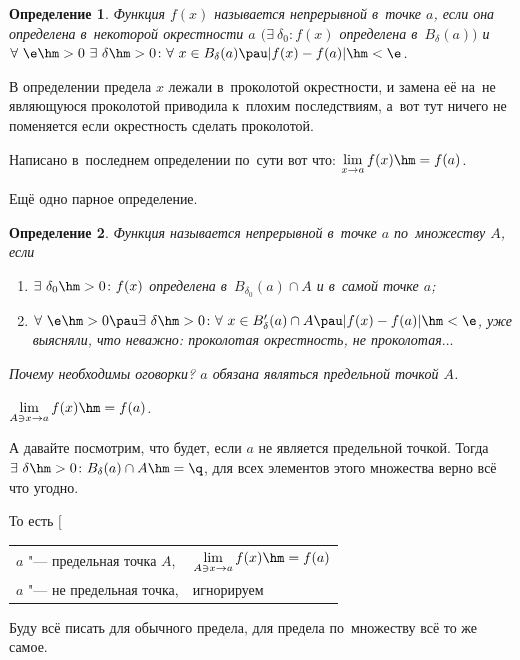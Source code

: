 \documentclass[a4paper,10pt,twoside]{article}
\newtheorem{Def}{Определение}[section]
\begin{document}
\begin{Def}
Функция $f(x)$ называется непрерывной в~точке $a$, если она определена в~некоторой окрестности 
$a$ $\big(\exists\ \delta_0\colon f(x)$ определена в~$B_\delta(a)\big)$ и 
$\forall\ \e\hm>0\ \exists\ \delta\hm>0\colon \forall\  x\in B_\delta(a)\pau |f(x)-f(a)|\hm<\e$.
\end{Def}
В определении предела $x$ лежали в~проколотой окрестности, и замена её на~не являющуюся проколотой приводила к~плохим последствиям, а~вот тут ничего не поменяется если окрестность сделать проколотой.

Написано в~последнем определении по~сути вот что: $\lim\limits_{x\to a}f(x)\hm=f(a)$.

Ещё одно парное определение.

\begin{Def}
Функция называется непрерывной в~точке $a$ по~множеству $A$, если

\begin{enumerate}
    \item $\exists\  \delta_0\hm>0\colon f(x)$ определена в~$B_{\delta_0}(a)\cap A$ и
        в~самой точке $a$;

    \item $\forall\ \e\hm>0\pau\exists\ \delta\hm>0\colon \forall\  x\in B'_{\delta}(a)\cap A \pau |f(x)-f(a)|\hm<\e$, уже выясняли, что неважно: проколотая окрестность, не проколотая$\ldots$
\end{enumerate}

Почему необходимы оговорки? $a$ обязана являться предельной точкой $A$.

$\lim\limits_{A\ni x\to a}f(x)\hm=f(a)$.
\end{Def}

А давайте посмотрим, что будет, если $a$ не является предельной точкой. Тогда $\exists\  \delta\hm>0\colon B_\delta(a)\cap A\hm=\q$, для всех элементов этого множества верно всё что угодно.

То есть $\Biggl[$ \begin{tabular}{ll}
$a$ "--- предельная точка $A$,& $\lim\limits_{A\ni x\to a}f(x)\hm=f(a)$\\
$a$ "--- не предельная точка,& игнорируем
\end{tabular}

Буду всё писать для обычного предела, для предела по~множеству всё то же самое.
\end{document}
